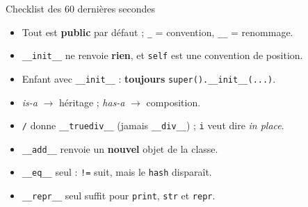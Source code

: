 \documentclass[a4paper,10pt]{article}
\newcommand{\co}[1]{\texttt{\textcolor{codefg}{#1}}}
\begin{document}
\vspace{0.3em}
\begin{astucebox}{Checklist des 60 dernières secondes}
\begin{minipage}[t]{0.485\linewidth}
\begin{itemize}
  \item Tout est \textbf{public} par défaut ; \co{\_} = convention,
        \co{\_\_} = renommage.
  \item \co{\_\_init\_\_} ne renvoie \textbf{rien}, et \co{self} est une
        convention de position.
  \item Enfant avec \co{\_\_init\_\_} : \textbf{toujours}
        \co{super().\_\_init\_\_(...)}.
  \item \emph{is-a} $\to$ héritage ; \emph{has-a} $\to$ composition.
\end{itemize}
\end{minipage}\hfill
\begin{minipage}[t]{0.485\linewidth}
\begin{itemize}
  \item \co{/} donne \co{\_\_truediv\_\_} (jamais \co{\_\_div\_\_}) ;
        \co{i} veut dire \emph{in place}.
  \item \co{\_\_add\_\_} renvoie un \textbf{nouvel} objet de la classe.
  \item \co{\_\_eq\_\_} seul : \co{!=} suit, mais le \co{hash} disparaît.
  \item \co{\_\_repr\_\_} seul suffit pour \co{print}, \co{str} et
        \co{repr}.
\end{itemize}
\end{minipage}
\end{astucebox}
\end{document}
